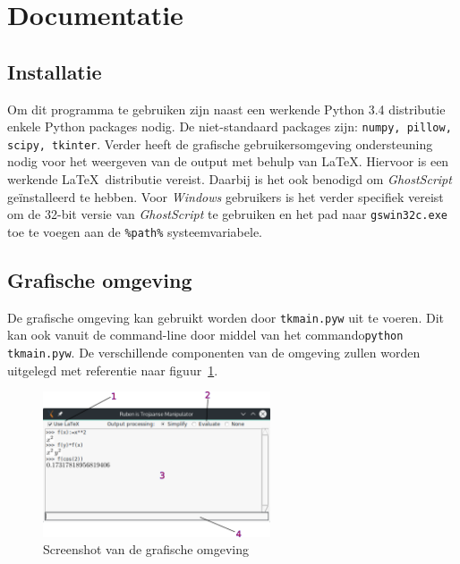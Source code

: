 \documentclass[a4paper]{article}
\begin{document}
\section{Documentatie}
\subsection{Installatie}
Om dit programma te gebruiken zijn naast een werkende Python 3.4 distributie enkele Python packages nodig. De niet-standaard packages zijn: \texttt{numpy, pillow, scipy, tkinter}.
Verder heeft de grafische gebruikersomgeving ondersteuning nodig voor het weergeven van de output met behulp van \LaTeX. Hiervoor is een werkende \LaTeX~distributie vereist. Daarbij is het ook benodigd om \emph{GhostScript} ge\"installeerd te hebben. Voor \emph{Windows} gebruikers is het verder specifiek vereist om de 32-bit versie van \emph{GhostScript} te gebruiken en het pad naar \texttt{gswin32c.exe} toe te voegen aan de \texttt{\%path\%} systeemvariabele.

\subsection{Grafische omgeving}
De grafische omgeving kan gebruikt worden door \texttt{tkmain.pyw} uit te voeren. Dit kan ook vanuit de command-line door middel van het commando\texttt{python tkmain.pyw}.  De verschillende componenten van de omgeving zullen worden uitgelegd met referentie naar figuur~\ref{fig:screenshot}.

\begin{figure}[!htb]
  \centering
  \includegraphics[width=0.6\textwidth]{screenshot.png}
  \caption{Screenshot van de grafische omgeving}
  \label{fig:screenshot}
\end{figure}
\end{document}
